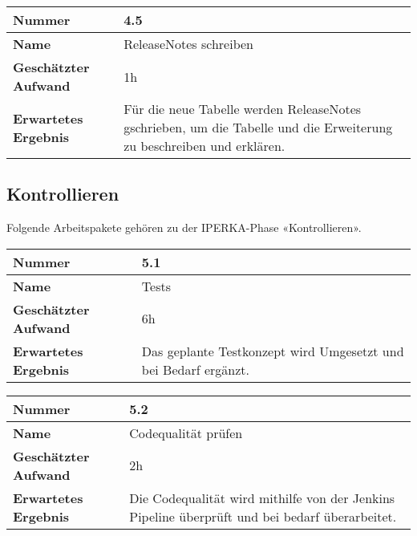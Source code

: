 \begin{longtable}{p{}|p{}}
	\hline
	\textbf{Nummer}                 & \textbf{4.5}            \\
	\hline
	\textbf{Name}   				& ReleaseNotes schreiben                  \\
	\hline
	\textbf{Geschätzter Aufwand}    & 1h                                    \\
	\hline
	\textbf{Erwartetes Ergebnis}    & Für die neue Tabelle werden ReleaseNotes gschrieben, um die Tabelle und die Erweiterung zu beschreiben und erklären.                                    \\
	\hline
\end{longtable}\label{tab:realisieren-4.5}

\subsection{Kontrollieren}
Folgende Arbeitspakete gehören zu der IPERKA-Phase «Kontrollieren».

\begin{longtable}{p{}|p{}}
	\hline
	\textbf{Nummer}                 & \textbf{5.1}            \\
	\hline
	\textbf{Name}   				& Tests                  \\
	\hline
	\textbf{Geschätzter Aufwand}    & 6h                                    \\
	\hline
	\textbf{Erwartetes Ergebnis}    & Das geplante Testkonzept wird Umgesetzt und bei Bedarf ergänzt.                                    \\
	\hline
\end{longtable}\label{tab:kontrollieren-5.1}

\begin{longtable}{p{}|p{}}
	\hline
	\textbf{Nummer}                 & \textbf{5.2}            \\
	\hline
	\textbf{Name}   				& Codequalität prüfen                  \\
	\hline
	\textbf{Geschätzter Aufwand}    & 2h                                    \\
	\hline
	\textbf{Erwartetes Ergebnis}    & Die Codequalität wird mithilfe von der Jenkins Pipeline überprüft und bei bedarf überarbeitet.                                    \\
	\hline
\end{longtable}\label{tab:kontrollieren-5.2}

